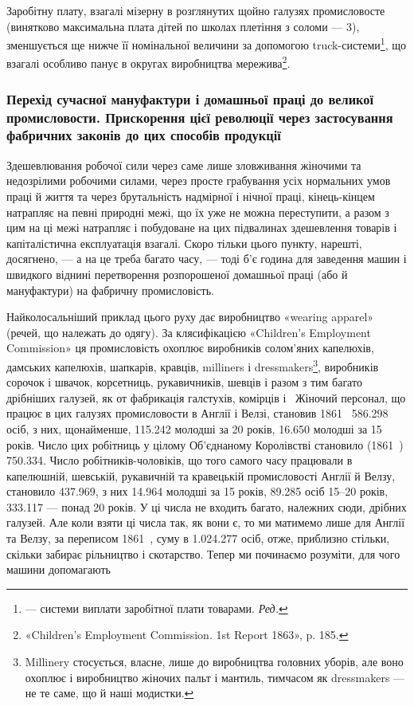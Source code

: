 Заробітну плату, взагалі мізерну в розглянутих щойно галузях
промисловосте (винятково максимальна плата дітей по школах
плетіння з соломи — 3), зменшується ще нижче її номінальної
величини за допомогою truck-системи\footnote*{
— системи виплати заробітної плати товарами. \emph{Ред.}
}, що взагалі особливо панує в округах виробництва мережива\footnote{
«Children’s Employment Commission. 1st Report 1863», p. 185.
}.

\subsubsection{Перехід сучасної мануфактури і домашньої
праці до великої промисловости. Прискорення
цієї революції через застосування фабричних
законів до цих способів продукції}

Здешевлювання робочої сили через саме лише зловживання
жіночими та недозрілими робочими силами, через просте грабування
усіх нормальних умов праці й життя та через брутальність
надмірної і нічної праці, кінець-кінцем натрапляє на певні природні
межі, що їх уже не можна переступити, а разом з цим
на ці межі натрапляє і побудоване на цих підвалинах здешевлення
товарів і капіталістична експлуатація взагалі. Скоро тільки цього
пункту, нарешті, досягнено, — а на це треба багато часу, — тоді
б’є година для заведення машин і швидкого віднині перетворення
розпорошеної домашньої праці (або й мануфактури) на фабричну
промисловість.

Найколосальніший приклад цього руху дає виробництво «wearing
apparel» (речей, що належать до одягу). За клясифікацією
«Children’s Employment Commission» ця промисловість охоплює
виробників солом’яних капелюхів, дамських капелюхів, шапкарів,
кравців, milliners і dressmakers\footnote{
Millinery стосується, власне, лише до виробництва головних уборів,
але воно охоплює і виробництво жіночих пальт і мантиль, тимчасом
як dressmakers — не те саме, що й наші модистки.
}, виробників сорочок і швачок,
корсетниць, рукавичників, шевців і разом з тим багато дрібніших
галузей, як от фабрикація галстухів, комірців і~ Жіночий
персонал, що працює в цих галузях промисловости в Англії і
Велзі, становив 1861~ \num{586.298} осіб, з них, щонайменше, \num{115.242}
молодші за 20 років, \num{16.650} молодші за 15 років. Число цих робітниць
у цілому Об’єднаному Королівстві становило (1861~)
\num{750.334}. Число робітників-чоловіків, що того самого часу працювали
в капелюшній, шевській, рукавичній та кравецькій промисловості
Англії й Велзу, становило \num{437.969}, з них \num{14.964} молодші
за 15 років, \num{89.285} осіб 15--20 років, \num{333.117} — понад 20 років.
У ці числа не входить багато, належних сюди, дрібних галузей.
Але коли взяти ці числа так, як вони є, то ми матимемо лише для
Англії та Велзу, за переписом 1861~, суму в \num{1.024.277} осіб,
отже, приблизно стільки, скільки забирає рільництво і скотарство.
Тепер ми починаємо розуміти, для чого машини допомагають
\parbreak{}  %
